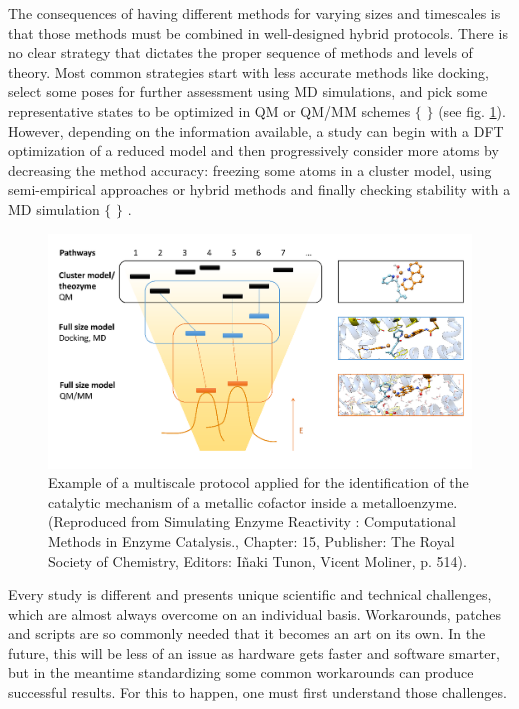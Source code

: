 The consequences of having different methods for varying sizes and timescales is that those methods must be combined in well-designed hybrid protocols. There is no clear strategy that dictates the proper sequence of methods and levels of theory. Most common strategies start with less accurate methods like docking, select some poses for further assessment using MD simulations, and pick some representative states to be optimized in QM or QM/MM schemes $ \{ $ $ \} $  (see fig. \ref{fig:multiscale}). However, depending on the information available, a study can begin with a DFT optimization of a reduced model and then progressively consider more atoms by decreasing the method accuracy: freezing some atoms in a cluster model, using semi-empirical approaches or hybrid methods and finally checking stability with a MD simulation $ \{ $ $ \} $ .


\begin{figure}[H]
		\includegraphics[width=\textwidth]{./figures/01/multiscaleprotocol.png}
		\caption[Example of a multiscale protocol]{Example of a multiscale protocol applied for the identification of the catalytic mechanism of a metallic cofactor inside a metalloenzyme.\cite{victor2014} (Reproduced from Simulating Enzyme Reactivity : Computational Methods in Enzyme Catalysis., Chapter: 15, Publisher: The Royal Society of Chemistry, Editors: Iñaki Tunon, Vicent Moliner, p. 514).}
		\label{fig:multiscale}
\end{figure}

Every study is different and presents unique scientific and technical challenges, which are almost always overcome on an individual basis. Workarounds, patches and scripts are so commonly needed that it becomes an art on its own. In the future, this will be less of an issue as hardware gets faster and software smarter, but in the meantime standardizing some common workarounds can produce successful results. For this to happen, one must first understand those challenges.

